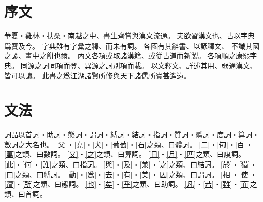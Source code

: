 \chapter*{序文}
華夏・雞林・扶桑・南越之中、書生齊嘗與漢文流通。
夫欲習漢文也、古以字典爲寶及今。
字典雖有字彙之釋、而未有詞。
各國有其辭書、以諺釋文、
不識其國之諺、畫中之餅也爾。
內文各項或取諸漢籍、或從古道而新製。
各項順之康熙字典。
同源之詞同項而登、異源之詞別項而載。
以文釋文、詳述其用、弱通漢文、皆可以讀。
此書之爲江湖諸賢所修與天下諸儒所寶甚遙遠。
\chapter*{文法}
詞品以首詞・助詞・態詞・謂詞・縛詞・結詞・指詞・質詞・體詞・度詞・算詞・數詞之大名也。
\cref{父}・\cref{堯}・\cref{犬}・\cref{葡萄}・\cref{石}之類、曰體詞。
\cref{二}・\cref{旬}・\cref{百}・\cref{萬}之類、曰數詞。
\cref{又}・\cref{之}之類、曰算詞。
\cref{日}・\cref{月}・\cref{匹}之類、曰度詞。
\cref{此}・\cref{何}・\cref{誰}之類、曰指詞。
\cref{與}・\cref{及}・\cref{兼}・\cref{之}之類、曰結詞。
\cref{於}・\cref{猶}・\cref{曰}之類、曰縛詞。
\cref{動}・\cref{爲}・\cref{去}・\cref{有}・\cref{美}・\cref{因}之類、曰謂詞。
\cref{相}・\cref{使}・\cref{遭}・\cref{所}之類、曰態詞。
\cref{也}・\cref{矣}・\cref{乎}之類、曰助詞。
\cref{凡}・\cref{若}・\cref{雖}・\cref{而}之類、曰首詞。
